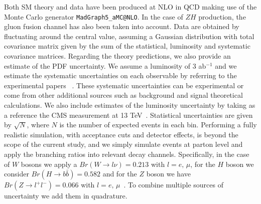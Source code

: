 \documentclass[withindex,glossary]{cam-thesis}
\makeatletter
\newcommand{\madgraph}{\texttt{MadGraph5\_aMC@NLO}{}}
\makeatother
\begin{document}
Both SM theory and data have been produced at NLO in QCD making use of the Monte Carlo generator \madgraph{}.
In the case of $ZH$ production, the gluon fusion channel has also been taken into account.
%
Data are obtained by fluctuating around the central value, assuming a Gaussian distribution with total 
covariance matrix given by the sum of the statistical, luminosity and systematic covariance matrices. 
Regarding the theory predictions, we also provide an estimate 
of the PDF uncertainty.
%
We assume a luminosity of $3$ ab$^{-1}$ and we estimate the systematic uncertainties on each observable 
by referring to the experimental papers~\cite{ATLAS:2020osn, ATLAS:2019bsc, CMS:2019efc} .
%
These systematic uncertainties can be experimental or come from other additional sources such as background and signal theoretical calculations.
%
We also include estimates of the luminosity uncertainty by taking as a reference the CMS measurement at 13 TeV~\cite{CMS:2018mdl}. 
%
Statistical uncertainties are given by $\sqrt{N}$, where $N$ is the number of expected events in each bin. Performing a fully realistic simulation, with acceptance cuts and detector effects, is beyond the scope of the current study, and we simply simulate events at parton level and apply the branching ratios into relevant decay channels. 
%
Specifically, in the case of $W$ bosons we apply a $Br(W \to l \nu) = 0.213$ with $l=e, \, \mu$, for the $H$ boson we consider $Br(H \to b \bar{b})=0.582$ and for the $Z$ boson we have $Br(Z \to l^+ l^-) = 0.066$ with $l=e, \, \mu$~\cite{Workman:2022ynf}.
%
To combine multiple sources of uncertainty we add them in quadrature.
%
\end{document}
